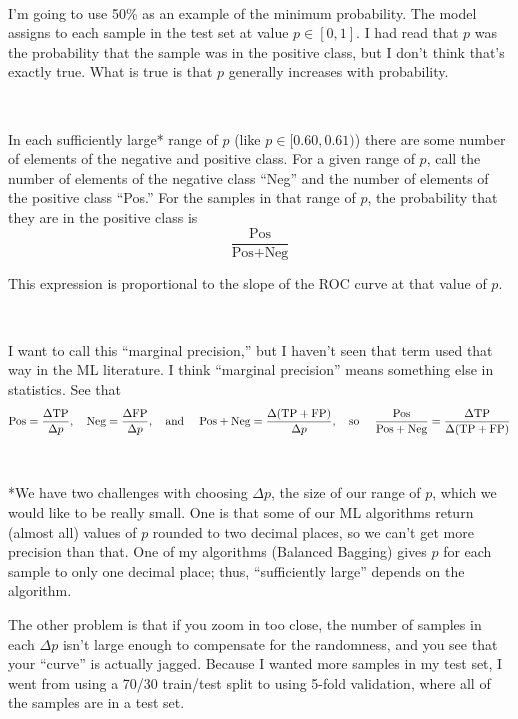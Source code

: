 \begin{enumerate}
	\
	
	I'm going to use 50\% as an example of the minimum probability.  The model assigns to each sample in the test set at value $p \in [0,1]$.  I had read that $p$ was the probability that the sample was in the positive class, but I don't think that's exactly true.  What is true is that $p$ generally increases with probability.  
	
	\
	
	In each sufficiently large* range of $p$ (like $p \in [0.60, 0.61)$) there are some number of elements of the negative and positive class.  For a given range of $p$, call the number of elements of the negative class ``Neg'' and the number of elements of the positive class ``Pos.''  For the samples in that range of $p$, the probability that they are in the positive class is 
	$$ \frac{\text{Pos}}{ \text{Pos} + \text{Neg}}$$
	
This expression is proportional to the slope of the ROC curve at that value of $p$. 
	
	\
	
	I want to call this ``marginal precision,'' but I haven't seen that term used that way in the ML literature.  I think ``marginal precision'' means something else in statistics.   See that 
	$$\text{Pos} = \frac{\Delta \text{TP}}{\Delta p}, \quad 
	 \text{Neg} = \frac{\Delta \text{FP}}{\Delta p}, \text{\quad and \quad} 
	 \text{Pos} + \text{Neg} = \frac{\Delta (\text{TP} + \text{FP})}{
\Delta p}, \text{\quad so \quad}
	\frac{\text{Pos}}{ \text{Pos} + \text{Neg}} = \frac{\Delta \text{TP}}{\Delta(\text{TP} + \text{FP})}
	$$

	\
	
	*We have two challenges with choosing $\Delta p$, the size of our range of $p$, which we would like to be really small.  One is that some of our ML algorithms return (almost all) values of $p$ rounded to two decimal places, so we can't get more precision than that.  One of my algorithms (Balanced Bagging) gives $p$ for each sample to only one decimal place; thus, ``sufficiently large'' depends on the algorithm.  
	
The other problem is that if you zoom in too close, the number of samples in each $\Delta p$ isn't large enough to compensate for the randomness, and you see that your ``curve'' is actually jagged.  Because I wanted more samples in my test set, I went from using a 70/30 train/test split to using 5-fold validation, where all of the samples are in a test set.  
	

\end{enumerate}

